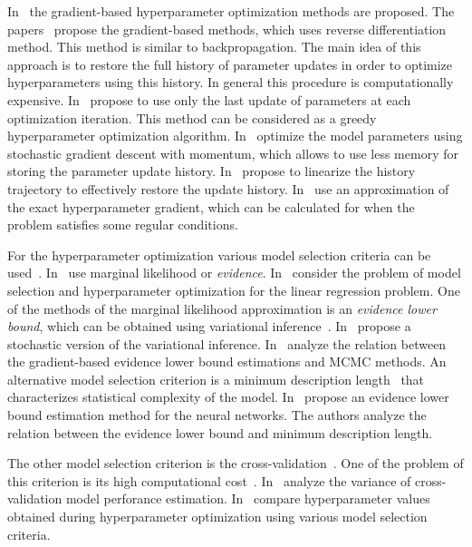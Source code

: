 \documentclass[12pt]{article}
\begin{document}
In~\cite{hyper, hyper2,  hyper_mad, hyper_hoag, hyper_greed} the gradient-based hyperparameter optimization methods are proposed. The papers~\cite{hyper_mad,hyper} propose the gradient-based methods, which uses reverse differentiation method. This method is similar to backpropagation. The main idea of this approach is to restore the full history of parameter updates in order to optimize hyperparameters using this history. In general this procedure is computationally expensive. In~\cite{hyper_greed} propose to use only the last update of parameters at each optimization iteration. This method can be considered as a greedy hyperparameter optimization algorithm. In~\cite{hyper} optimize the model parameters using stochastic gradient descent with momentum, which allows to use less memory for storing the parameter update history. In~\cite{hyper_mad} propose to linearize the history trajectory to effectively restore the update history. In~\cite{hyper_hoag} use an approximation of the exact hyperparameter gradient, which can be calculated for when the problem satisfies some regular conditions.

For the hyperparameter optimization various model selection criteria can be used~\cite{MacKay,Bishop}. 
In~\cite{MacKay,Bishop,tokmakova, strijov_dsc} use marginal likelihood or \textit{evidence}. In~\cite{tokmakova, strijov_dsc} consider the problem of model selection and hyperparameter optimization for the linear regression problem. One of the methods of the marginal likelihood approximation is an \textit{evidence lower bound}, which can be obtained using variational inference~\cite{Bishop}. In~\cite{hoffman} propose a stochastic version of the variational inference. In~\cite{varmc} analyze the relation between the gradient-based evidence lower bound estimations and MCMC methods. An alternative model selection criterion is a minimum description length~\cite{mdl} that characterizes statistical complexity of the model. In~\cite{nips}  propose an evidence lower bound estimation method for the neural networks. The authors analyze the relation between the evidence lower bound and minimum description length. 

The other model selection criterion is the cross-validation~\cite{cv_ms, tokmakova}. One of the problem of this criterion is its high computational cost~\cite{expensive,expensive2}. In~\cite{bias,bias2} analyze the variance of cross-validation model perforance estimation. In~\cite{tokmakova} compare hyperparameter values obtained during hyperparameter optimization using various model selection criteria.
\end{document}
